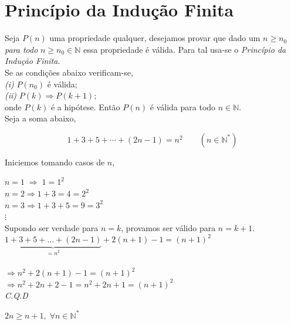 \section{Princípio da Indução Finita}
\noindent
Seja $P(n)$ uma propriedade qualquer, desejamos provar que dado um $n  \geq n_0$ \textit{para todo} $n \geq n_0 \in \mathbb{N}$ essa propriedade é válida. Para tal usa-se o \textit{Princípio da Indução Finita}. \\


\noindent
Se as condições abaixo verificam-se,\\

\noindent
\textit{(i)} $P(n_0)$ é válida; \\
\textit{(ii)} $P(k) \Rightarrow P(k + 1)$; \\

\noindent
onde $P(k)$ é a hipótese. Então $P(n)$ é válida para todo $n \in \mathbb{N}$.\\

\noindent
Seja a soma abaixo,

$$ 1 + 3 + 5 + \cdots + (2n - 1) = n^2 \qquad (n \in \mathbb{N^*})$$  

\noindent
Iniciemos tomando casos de $n$, 

\noindent
$n = 1 \; \Rightarrow \; 1 =  1^2$ \\
$n = 2 \Rightarrow 1 + 3 = 4 = 2^2$ \\
$n = 3 \Rightarrow 1 + 3 + 5 = 9 = 3^2$ \\
$ \vdots $  \\

\noindent
Supondo ser verdade para $n = k$, provamos ser válido para $ n = k + 1$. \\

\noindent
$ \underbrace{ 1 + 3 + 5 + \dots + (2n - 1)}_{=n^2} + 2(n+ 1) - 1 = (n + 1)^2 $\\ \\
$ \Rightarrow n^2 + 2(n+1) - 1 = (n+1)^2$ \\
$ \Rightarrow n^2 + 2n + 2 - 1 = n^2 + 2n + 1 = (n + 1 )^2 $ \\ 

\hspace*{0pt}\hfill \textit{C.Q.D}


\noindent
\text{\maltese} $ 2n \geq n + 1, \; \forall n \in \mathbb{N^*}$ 

